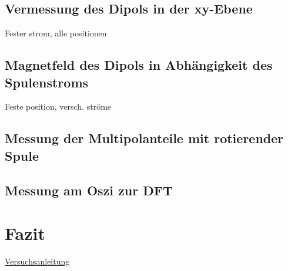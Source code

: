 \documentclass[bigchapter,colorback,accentcolor=tud4b,linedtoc,11pt]{tudreport}
\begin{document}
\section{Vermessung des Dipols in der xy-Ebene}

Fester strom, alle positionen

\section{Magnetfeld des Dipols in Abhängigkeit des Spulenstroms}

Feste position, versch. ströme

\section{Messung der Multipolanteile mit rotierender Spule}

\section{Messung am Oszi zur DFT}

\chapter{Fazit}


\cleardoublepage{}
\newpage
\begin{thebibliography}{100}
   \url{Versuchsanleitung}
\end{thebibliography}
\end{document}
